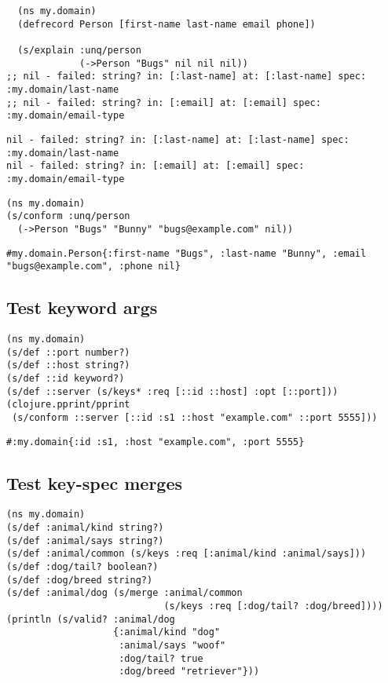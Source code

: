 \documentclass[10pt,oneside,x11names]{article}
\begin{document}
\begin{verbatim}
  (ns my.domain)
  (defrecord Person [first-name last-name email phone])

  (s/explain :unq/person
             (->Person "Bugs" nil nil nil))
;; nil - failed: string? in: [:last-name] at: [:last-name] spec: :my.domain/last-name
;; nil - failed: string? in: [:email] at: [:email] spec: :my.domain/email-type
\end{verbatim}

\begin{verbatim}
nil - failed: string? in: [:last-name] at: [:last-name] spec: :my.domain/last-name
nil - failed: string? in: [:email] at: [:email] spec: :my.domain/email-type
\end{verbatim}


\begin{verbatim}
(ns my.domain)
(s/conform :unq/person
  (->Person "Bugs" "Bunny" "bugs@example.com" nil))
\end{verbatim}

\begin{verbatim}
#my.domain.Person{:first-name "Bugs", :last-name "Bunny", :email "bugs@example.com", :phone nil}
\end{verbatim}

\subsection{Test keyword args}
\label{sec:orgc1bb8cd}

\begin{verbatim}
(ns my.domain)
(s/def ::port number?)
(s/def ::host string?)
(s/def ::id keyword?)
(s/def ::server (s/keys* :req [::id ::host] :opt [::port]))
(clojure.pprint/pprint
 (s/conform ::server [::id :s1 ::host "example.com" ::port 5555]))
\end{verbatim}

\begin{verbatim}
#:my.domain{:id :s1, :host "example.com", :port 5555}
\end{verbatim}

\subsection{Test key-spec merges}
\label{sec:orgd0cdf5b}

\begin{verbatim}
(ns my.domain)
(s/def :animal/kind string?)
(s/def :animal/says string?)
(s/def :animal/common (s/keys :req [:animal/kind :animal/says]))
(s/def :dog/tail? boolean?)
(s/def :dog/breed string?)
(s/def :animal/dog (s/merge :animal/common
                            (s/keys :req [:dog/tail? :dog/breed])))
(println (s/valid? :animal/dog
                   {:animal/kind "dog"
                    :animal/says "woof"
                    :dog/tail? true
                    :dog/breed "retriever"}))
\end{verbatim}
\end{document}
